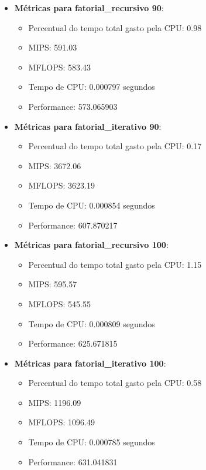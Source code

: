 \documentclass[12pt]{article}
\begin{document}
\begin{itemize}
    \item \textbf{Métricas para fatorial\_recursivo 90}:
    \begin{itemize}
        \item Percentual do tempo total gasto pela CPU: 0.98
        \item MIPS: 591.03
        \item MFLOPS: 583.43
        \item Tempo de CPU: 0.000797 segundos
        \item Performance: 573.065903
    \end{itemize}

    \item \textbf{Métricas para fatorial\_iterativo 90}:
    \begin{itemize}
        \item Percentual do tempo total gasto pela CPU: 0.17
        \item MIPS: 3672.06
        \item MFLOPS: 3623.19
        \item Tempo de CPU: 0.000854 segundos
        \item Performance: 607.870217
    \end{itemize}

    \item \textbf{Métricas para fatorial\_recursivo 100}:
    \begin{itemize}
        \item Percentual do tempo total gasto pela CPU: 1.15
        \item MIPS: 595.57
        \item MFLOPS: 545.55
        \item Tempo de CPU: 0.000809 segundos
        \item Performance: 625.671815
    \end{itemize}

    \item \textbf{Métricas para fatorial\_iterativo 100}:
    \begin{itemize}
        \item Percentual do tempo total gasto pela CPU: 0.58
        \item MIPS: 1196.09
        \item MFLOPS: 1096.49
        \item Tempo de CPU: 0.000785 segundos
        \item Performance: 631.041831
    \end{itemize}


\end{itemize}
\end{document}
